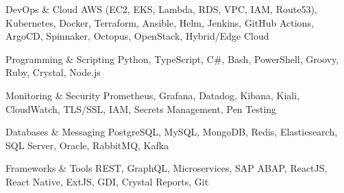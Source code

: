 
\begin{cvskills}

  \cvskill
    {DevOps \& Cloud}
    {AWS (EC2, EKS, Lambda, RDS, VPC, IAM, Route53), Kubernetes, Docker, Terraform, Ansible, Helm, Jenkins, GitHub Actions, ArgoCD, Spinnaker, Octopus, OpenStack, Hybrid/Edge Cloud}

  \cvskill
    {Programming \& Scripting}
    {Python, TypeScript, C\#, Bash, PowerShell, Groovy, Ruby, Crystal, Node.js}

  \cvskill
    {Monitoring \& Security}
    {Prometheus, Grafana, Datadog, Kibana, Kiali, CloudWatch, TLS/SSL, IAM, Secrets Management, Pen Testing}

  \cvskill
    {Databases \& Messaging}
    {PostgreSQL, MySQL, MongoDB, Redis, Elasticsearch, SQL Server, Oracle, RabbitMQ, Kafka}

  \cvskill
    {Frameworks \& Tools}
    {REST, GraphQL, Microservices, SAP ABAP, ReactJS, React Native, ExtJS, GDI, Crystal Reports, Git}\\

\end{cvskills}
